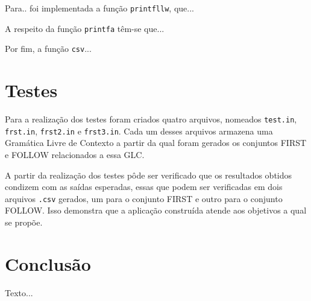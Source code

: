 \documentclass[12pt]{article}
\begin{document}
Para.. foi implementada a função \texttt{printfllw}, que...

A respeito da função \texttt{printfa} têm-se que...

Por fim, a função \texttt{csv}...


\section{Testes}
\label{5}

Para a realização dos testes foram criados quatro arquivos, nomeados \texttt{test.in}, \texttt{frst.in}, \texttt{frst2.in} e \texttt{frst3.in}. Cada um desses arquivos armazena uma Gramática Livre de Contexto a partir da qual foram gerados os conjuntos FIRST e FOLLOW relacionados a essa GLC.

A partir da realização dos testes pôde ser verificado que os resultados obtidos condizem com as saídas esperadas, essas que podem ser verificadas em dois arquivos \texttt{.csv} gerados, um para o conjunto FIRST e outro para o conjunto FOLLOW. Isso demonstra que a aplicação construída atende aos objetivos a qual se propõe.

\section{Conclusão}
\label{6}

Texto...



\end{document}
